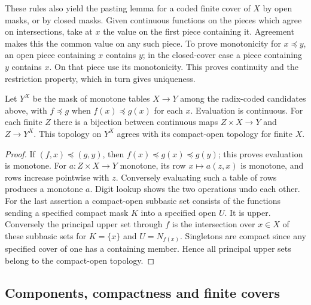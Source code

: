 These rules also yield the pasting lemma for a coded finite cover of $X$
by open masks, or by closed masks. Given continuous functions on the
pieces which agree on intersections, take at $x$ the value on the first
piece containing it. Agreement makes this the common value on any such
piece. To prove monotonicity for $x\preceq y$, an open piece containing
$x$ contains $y$; in the closed-cover case a piece containing $y$ contains
$x$. On that piece use its monotonicity. This proves continuity and the
restriction property, which in turn gives uniqueness.

\begin{proposition}\label{idx-finite324}
Let $Y^X$ be the mask of monotone tables $X\to Y$ among the radix-coded
candidates above, with $f\preceq g$ when $f(x)\preceq g(x)$ for each $x$.
Evaluation is continuous. For each finite $Z$ there is a bijection
between continuous maps $Z\times X\to Y$ and $Z\to Y^X$. This topology
on $Y^X$ agrees with its compact-open topology for finite $X$.
\end{proposition}
\begin{proof}
If $(f,x)\preceq(g,y)$, then $f(x)\preceq g(x)\preceq g(y)$; this
proves evaluation is monotone. For $a:Z\times X\to Y$ monotone, its row
$x\mapsto a(z,x)$ is monotone, and rows increase pointwise with $z$.
Conversely evaluating such a table of rows produces a monotone $a$.
Digit lookup shows the two operations undo each other. For the last
assertion a compact-open subbasic set consists of the functions sending
a specified compact mask $K$ into a specified open $U$. It is upper.
Conversely the principal upper set through $f$ is the intersection over
$x\in X$ of these subbasic sets for $K=\{x\}$ and $U=N_{f(x)}$.
Singletons are compact since any specified cover of one has a containing
member. Hence all principal upper sets belong to the compact-open topology.
\end{proof}

\subsection{Components, compactness and finite covers}
\label{sec:finite-components}

